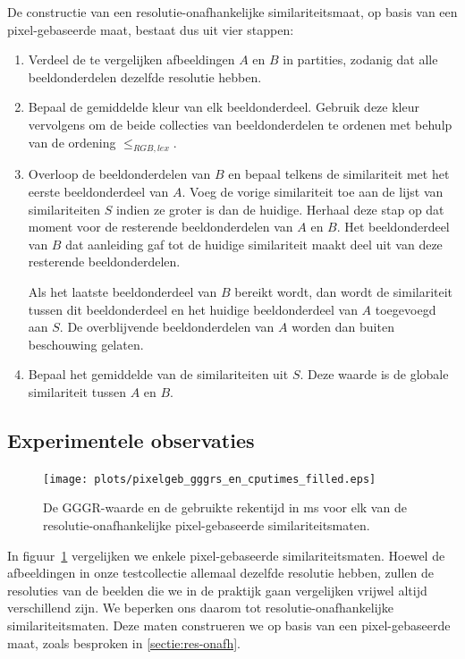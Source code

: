 De constructie van een resolutie-onafhankelijke similariteitsmaat, 
op basis van een pixel-gebaseerde maat, bestaat dus uit vier stappen:
\begin{enumerate}
\item Verdeel de te vergelijken afbeeldingen $A$ en $B$
in partities, zodanig dat alle beeldonderdelen dezelfde resolutie hebben.
\item Bepaal de gemiddelde kleur van elk beeldonderdeel. Gebruik deze kleur vervolgens
om de beide collecties van beeldonderdelen te ordenen met behulp van de ordening $\leq_{RGB,lex}$.
\item Overloop de beeldonderdelen van $B$ en bepaal telkens de similariteit met het eerste 
beeldonderdeel van $A$. Voeg de vorige similariteit toe aan de lijst van similariteiten $S$
indien ze groter is dan de huidige. Herhaal deze stap op dat moment voor de resterende
beeldonderdelen van $A$ en $B$. Het 
beeldonderdeel van $B$ dat aanleiding gaf tot de huidige similariteit maakt deel uit van
deze resterende beeldonderdelen.

Als het laatste beeldonderdeel van $B$ bereikt wordt, dan wordt de similariteit tussen dit
beeldonderdeel en het huidige beeldonderdeel van $A$ toegevoegd aan $S$. De overblijvende
beeldonderdelen van $A$ worden dan buiten beschouwing gelaten. 
\item Bepaal het gemiddelde van de similariteiten uit $S$. Deze waarde is de globale similariteit tussen
$A$ en $B$.
\end{enumerate}


\subsection{Experimentele observaties}

\begin{figure}[tbp]
\begin{center}
\texttt{[image: plots/pixelgeb\_gggrs\_en\_cputimes\_filled.eps]}
\caption{\label{fig:pixelgeb_gggrs_en_cputimes}De GGGR-waarde en de gebruikte rekentijd in ms voor elk van de resolutie-onafhankelijke pixel-gebaseerde similariteitsmaten.}
\end{center}
\end{figure}

In figuur~\ref{fig:pixelgeb_gggrs_en_cputimes} vergelijken we enkele pixel-gebaseerde similariteitsmaten.
Hoewel de afbeeldingen in onze testcollectie allemaal dezelfde resolutie hebben, zullen de
resoluties van de beelden die we in de praktijk gaan vergelijken vrijwel altijd verschillend zijn.
We beperken ons daarom tot resolutie-onafhankelijke similariteitsmaten. Deze maten construeren
we op basis van een pixel-gebaseerde maat, zoals besproken in \ref{sectie:res-onafh}.

